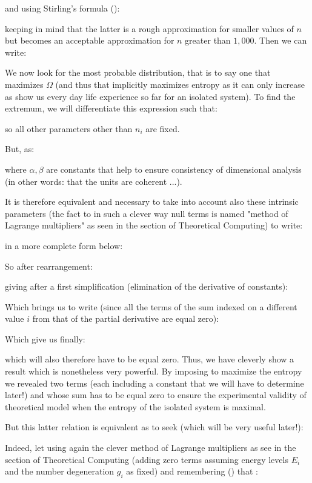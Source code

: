 	and using Stirling's formula ():
	
	keeping in mind that the latter is a rough approximation for smaller values of $n$ but becomes an acceptable approximation for $n$ greater than $1,000$.
	Then we can write:
	
	We now look for the most probable distribution, that is to say one that maximizes $\Omega$ (and thus that implicitly maximizes entropy as it can only increase as show us every day life experience so far for an isolated system). To find the extremum, we will differentiate this expression such that:
	
	so all other parameters other than $n_i$ are fixed.

	But, as:
	
	where $\alpha,\beta$ are constants that help to ensure consistency of dimensional analysis (in other words: that the units are coherent ...).
	
	It is therefore equivalent and necessary to take into account also these intrinsic parameters (the fact to in such a clever way null terms is named "method of Lagrange multipliers" as seen in the section of Theoretical Computing) to write:
	
	in a more complete form below:
	
	So after rearrangement:
	
	giving after a first simplification (elimination of the derivative of constants):
	
	Which brings us to write (since all the terms of the sum indexed on a different value $i$ from that of the partial derivative are equal zero):
	
	Which give us finally:
	
	which will also therefore have to be equal zero. Thus, we have cleverly show a result which is nonetheless very powerful. By imposing to maximize the entropy we revealed two terms (each including a constant that we will have to determine later!) and whose sum has to be equal zero to ensure the experimental validity of theoretical model when the entropy of the isolated system is maximal.
	
	But this latter relation is equivalent as to seek (which will be very useful later!):
	
	Indeed, let using again the clever method of Lagrange multipliers as see in the section of Theoretical Computing (adding zero terms assuming energy levels $E_i$ and the number degeneration $g_i$ as fixed) and remembering () that :
	
